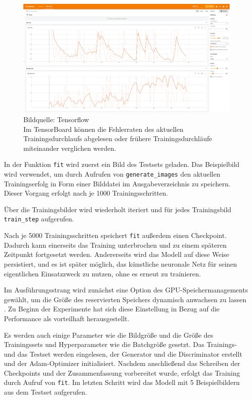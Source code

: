 \begin{figure}[h]
	\centering
	\includegraphics[width=1.0\textwidth]{bilder/tensorboard.png}
	\caption[TensorBoard]{Bildquelle: Tensorflow \cite{tensorflow2015-whitepaper} \\ Im TensorBoard können die Fehlerraten des aktuellen Trainingsdurchlaufs abgelesen oder frühere Trainingsdurchläufe miteinander verglichen werden.}
	\label{fig:tensorboard}
\end{figure}

In der Funktion \lstinline|fit| wird zuerst ein Bild des Testsets geladen. Das Beispielbild wird verwendet, um durch Aufrufen von \lstinline|generate_images| den aktuellen Trainingserfolg in Form einer Bilddatei im Ausgabeverzeichnis zu speichern. Dieser Vorgang erfolgt nach je 1000 Trainingsschritten.

Über die Trainingsbilder wird wiederholt iteriert und für jedes Trainingsbild \lstinline|train_step| aufgerufen.

Nach je 5000 Trainingsschritten speichert \lstinline|fit| außerdem einen Checkpoint. Dadurch kann einerseits das Training unterbrochen und zu einem späteren Zeitpunkt fortgesetzt werden. Andererseits wird das Modell auf diese Weise persistiert, und es ist später möglich, das künstliche neuronale Netz für seinen eigentlichen Einsatzzweck zu nutzen, ohne es erneut zu trainieren.

Im Ausführungsstrang wird zunächst eine Option des GPU-Speichermanagements gewählt, um die Größe des reservierten Speichers dynamisch anwachsen zu lassen \cite{zaccone2018tensorflow}. Zu Beginn der Experimente hat sich diese Einstellung in Bezug auf die Performance als vorteilhaft herausgestellt.

Es werden auch einige Parameter wie die Bildgröße und die Größe des Trainingssets und Hyperparameter wie die Batchgröße gesetzt. Das Trainings- und das Testset werden eingelesen, der Generator und die Discriminator erstellt und der Adam-Optimizer initialisiert. Nachdem anschließend das Schreiben der Checkpoints und der Zusammenfassung vorbereitet wurde, erfolgt das Training durch Aufruf von \lstinline|fit|. Im letzten Schritt wird das Modell mit 5 Beispielbildern aus dem Testset aufgerufen.

